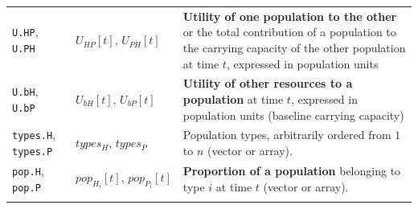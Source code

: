 \documentclass[
]{book}
\begin{document}
\begin{longtable}[]{@{}lll@{}}
\begin{minipage}[t]{0.36\columnwidth}
\texttt{U.HP}, \texttt{U.PH}\strut
\end{minipage} & \begin{minipage}[t]{0.21\columnwidth}\raggedright
\(U_{HP}[t],\,U_{PH}[t]\)\strut
\end{minipage} & \begin{minipage}[t]{0.34\columnwidth}\raggedright
\textbf{Utility of one population to the other} or the total contribution of a population to the carrying capacity of the other population at time \(t\), expressed in population units\strut
\end{minipage}\tabularnewline
\begin{minipage}[t]{0.36\columnwidth}\raggedright
\texttt{U.bH}, \texttt{U.bP}\strut
\end{minipage} & \begin{minipage}[t]{0.21\columnwidth}\raggedright
\(U_{bH}[t],\,U_{bP}[t]\)\strut
\end{minipage} & \begin{minipage}[t]{0.34\columnwidth}\raggedright
\textbf{Utility of other resources to a population} at time \(t\), expressed in population units (baseline carrying capacity)\strut
\end{minipage}\tabularnewline
\begin{minipage}[t]{0.36\columnwidth}\raggedright
\texttt{types.H}, \texttt{types.P}\strut
\end{minipage} & \begin{minipage}[t]{0.21\columnwidth}\raggedright
\(types_{H},\,types_{P}\)\strut
\end{minipage} & \begin{minipage}[t]{0.34\columnwidth}\raggedright
Population types, arbitrarily ordered from \(1\) to \(n\) (vector or array).\strut
\end{minipage}\tabularnewline
\begin{minipage}[t]{0.36\columnwidth}\raggedright
\texttt{pop.H}, \texttt{pop.P}\strut
\end{minipage} & \begin{minipage}[t]{0.21\columnwidth}\raggedright
\(pop_{H_{i}}[t],\,pop_{P_{i}}[t]\)\strut
\end{minipage} & \begin{minipage}[t]{0.34\columnwidth}\raggedright
\textbf{Proportion of a population} belonging to type \(i\) at time \(t\) (vector or array).\strut
\end{minipage}\tabularnewline
\begin{minipage}[t]{0.36\columnwidth}\raggedright

\end{minipage}
\end{longtable}
\end{document}

